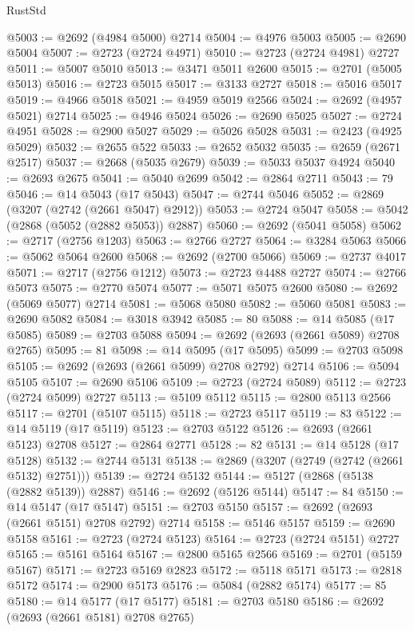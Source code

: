 \begin{lexlean}{RustStd}
\begin{coremodule}
@5003 := @2692 (@4984 @5000) @2714
@5004 := @4976 @5003
@5005 := @2690 @5004
@5007 := @2723 (@2724 @4971)
@5010 := @2723 (@2724 @4981) @2727
@5011 := @5007 @5010
@5013 := @3471 @5011 @2600
@5015 := @2701 (@5005 @5013)
@5016 := @2723 @5015
@5017 := @3133 @2727
@5018 := @5016 @5017
@5019 := @4966 @5018
@5021 := @4959 @5019 @2566
@5024 := @2692 (@4957 @5021) @2714
@5025 := @4946 @5024
@5026 := @2690 @5025
@5027 := @2724 @4951
@5028 := @2900 @5027
@5029 := @5026 @5028
@5031 := @2423 (@4925 @5029)
@5032 := @2655 @522
@5033 := @2652 @5032
@5035 := @2659 (@2671 @2517)
@5037 := @2668 (@5035 @2679)
@5039 := @5033 @5037 @4924
@5040 := @2693 @2675
@5041 := @5040 @2699
@5042 := @2864 @2711
@5043 := 79
@5046 := @14 @5043 (@17 @5043)
@5047 := @2744 @5046
@5052 := @2869 (@3207 (@2742 (@2661 @5047) @2912))
@5053 := @2724 @5047
@5058 := @5042 (@2868 (@5052 (@2882 @5053)) @2887)
@5060 := @2692 (@5041 @5058)
@5062 := @2717 (@2756 @1203)
@5063 := @2766 @2727
@5064 := @3284 @5063
@5066 := @5062 @5064 @2600
@5068 := @2692 (@2700 @5066)
@5069 := @2737 @4017
@5071 := @2717 (@2756 @1212)
@5073 := @2723 @4488 @2727
@5074 := @2766 @5073
@5075 := @2770 @5074
@5077 := @5071 @5075 @2600
@5080 := @2692 (@5069 @5077) @2714
@5081 := @5068 @5080
@5082 := @5060 @5081
@5083 := @2690 @5082
@5084 := @3018 @3942
@5085 := 80
@5088 := @14 @5085 (@17 @5085)
@5089 := @2703 @5088
@5094 := @2692 (@2693 (@2661 @5089) @2708 @2765)
@5095 := 81
@5098 := @14 @5095 (@17 @5095)
@5099 := @2703 @5098
@5105 := @2692 (@2693 (@2661 @5099) @2708 @2792) @2714
@5106 := @5094 @5105
@5107 := @2690 @5106
@5109 := @2723 (@2724 @5089)
@5112 := @2723 (@2724 @5099) @2727
@5113 := @5109 @5112
@5115 := @2800 @5113 @2566
@5117 := @2701 (@5107 @5115)
@5118 := @2723 @5117
@5119 := 83
@5122 := @14 @5119 (@17 @5119)
@5123 := @2703 @5122
@5126 := @2693 (@2661 @5123) @2708
@5127 := @2864 @2771
@5128 := 82
@5131 := @14 @5128 (@17 @5128)
@5132 := @2744 @5131
@5138 := @2869 (@3207 (@2749 (@2742 (@2661 @5132) @2751)))
@5139 := @2724 @5132
@5144 := @5127 (@2868 (@5138 (@2882 @5139)) @2887)
@5146 := @2692 (@5126 @5144)
@5147 := 84
@5150 := @14 @5147 (@17 @5147)
@5151 := @2703 @5150
@5157 := @2692 (@2693 (@2661 @5151) @2708 @2792) @2714
@5158 := @5146 @5157
@5159 := @2690 @5158
@5161 := @2723 (@2724 @5123)
@5164 := @2723 (@2724 @5151) @2727
@5165 := @5161 @5164
@5167 := @2800 @5165 @2566
@5169 := @2701 (@5159 @5167)
@5171 := @2723 @5169 @2823
@5172 := @5118 @5171
@5173 := @2818 @5172
@5174 := @2900 @5173
@5176 := @5084 (@2882 @5174)
@5177 := 85
@5180 := @14 @5177 (@17 @5177)
@5181 := @2703 @5180
@5186 := @2692 (@2693 (@2661 @5181) @2708 @2765)

\end{coremodule}
\end{lexlean}
